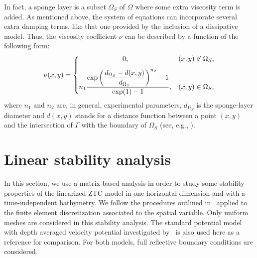 In fact, a sponge layer is a subset $\Omega_S$ of $\Omega$ where some
extra viscosity term is added.  As mentioned above, the system of
equations can incorporate several extra damping terms, like that one
provided by the inclusion of a dissipative model. Thus, the viscosity
coefficient $\nu$ can be described by a function of the following
form:
\begin{equation}
\label{eq:lopes:sponge}
\nu(x,y)= \left\{
  \begin{matrix}
    0,& (x,y)\not\in\Omega_S ,\vspace{0.3cm}\\ \displaystyle
    n_1\frac{\displaystyle\exp{\left(\frac{d_{\Omega_S}-d(x,y)}
          {d_{\Omega_S}}\right)^{n_2}}-1}{\exp(1)-1},& (x,y)
    \in\Omega_S,
  \end{matrix}
\right.
\end{equation}
where $n_1$ and $n_2$ are, in general, experimental parameters,
$d_{\Omega_S}$ is the sponge-layer diameter and $d(x,y)$ stands for a
distance function between a point $(x,y)$ and the intersection of
$\Gamma$ with the boundary of $\Omega_S$ (see,
e.g., \citet{Walkley1999}).

\section{Linear stability analysis}
\label{sec:lopes:linearanalysis}

In this section, we use a matrix-based analysis in order to study some
stability properties of the linearized ZTC model in one horizontal
dimension and with a time-independent bathymetry. We follow the
procedures outlined in~\citet{LovholtPedersen2009} applied to the
finite element discretization associated to the spatial variable.
Only uniform meshes are considered in this stability analysis.  The
standard potential model with depth averaged velocity potential
investigated by~\citet{LovholtPedersen2009} is also used here as a
reference for comparison.  For both models, full reflective boundary
conditions are considered.

